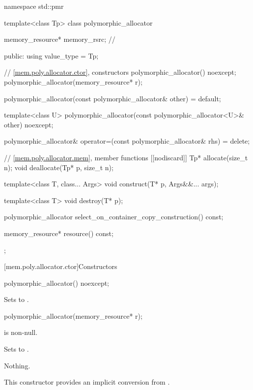 %
%
\begin{codeblock}
namespace std::pmr {
  template<class Tp> class polymorphic_allocator {
    memory_resource* memory_rsrc;     // \expos

  public:
    using value_type = Tp;

    // \ref{mem.poly.allocator.ctor}, constructors
    polymorphic_allocator() noexcept;
    polymorphic_allocator(memory_resource* r);

    polymorphic_allocator(const polymorphic_allocator& other) = default;

    template<class U>
      polymorphic_allocator(const polymorphic_allocator<U>& other) noexcept;

    polymorphic_allocator& operator=(const polymorphic_allocator& rhs) = delete;

    // \ref{mem.poly.allocator.mem}, member functions
    [[nodiscard]] Tp* allocate(size_t n);
    void deallocate(Tp* p, size_t n);

    template<class T, class... Args>
      void construct(T* p, Args&&... args);

    template<class T>
      void destroy(T* p);

    polymorphic_allocator select_on_container_copy_construction() const;

    memory_resource* resource() const;
  };
}
\end{codeblock}

[mem.poly.allocator.ctor]{Constructors}

%
\begin{itemdecl}
polymorphic_allocator() noexcept;
\end{itemdecl}

\begin{itemdescr}
\pnum
\effects
Sets  to .
\end{itemdescr}

%
\begin{itemdecl}
polymorphic_allocator(memory_resource* r);
\end{itemdecl}

\begin{itemdescr}
\pnum
\requires
{} is non-null.

\pnum
\effects
Sets  to .

\pnum
\throws
Nothing.

\pnum
\begin{note}
This constructor provides an implicit conversion from .
\end{note}
\end{itemdescr}

